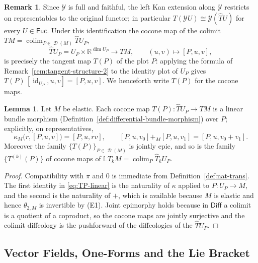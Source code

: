 \documentclass{amsart}
\newcommand{\R}{\mathbb{R}}
\DeclareMathOperator{\D}{\mathcal{D}}
\DeclareMathOperator{\id}{id}
\DeclareMathOperator{\colim}{colim}
\theoremstyle{definition}
\newtheorem{rem}[thm]{Remark}
\newtheorem{lem}[thm]{Lemma}
\begin{document}
\begin{rem}\label{rem:cocone-TP}
Since $\mathcal{Y}$ is full and faithful, the left Kan extension along
$\mathcal{Y}$ restricts on representables to the original functor; in
particular $T(\mathcal{Y}U) \cong \mathcal{Y}(\hat{T}U)$ for every
$U \in \mathsf{Euc}$. Under this identification the cocone map of the colimit
$TM = \colim_{P \in \D(M)} \hat{T}U_P$,
\begin{equation*}
  \hat{T}U_P = U_P \times \R^{\dim U_P} \longrightarrow TM,
  \qquad (u,v) \longmapsto [P,u,v],
\end{equation*}
is precisely the tangent map $T(P)$ of the plot $P$: applying the formula of
Remark~\ref{rem:tangent-structure-2} to the identity plot of $U_P$ gives
$T(P)\,[\id_{U_P},u,v] = [P,u,v]$. We henceforth write $T(P)$ for the cocone
maps.
\end{rem}

\begin{lem}\label{lem:TP-linear}
Let $M$ be elastic. Each cocone map $T(P) \colon \hat{T}U_P \to TM$ is a
linear bundle morphism (Definition~\ref{def:differential-bundle-morphism})
over $P$; explicitly, on representatives,
\begin{equation}\label{eq:TP-linear}
  \kappa_M\bigl(r,[P,u,v]\bigr) = [P,u,rv],
  \qquad
  [P,u,v_0] +_M [P,u,v_1] = [P,u,v_0+v_1].
\end{equation}
Moreover the family $\{T(P)\}_{P \in \D(M)}$ is jointly epic, and so is the
family $\{T^{(k)}(P)\}$ of cocone maps of
$\mathbb{L}\hat{T}_kM = \colim_P \hat{T}_kU_P$.
\end{lem}

\begin{proof}
Compatibility with $\pi$ and $0$ is immediate from
Definition~\ref{def:nat-trans}. The first identity in \eqref{eq:TP-linear} is
the naturality of $\kappa$ applied to $P \colon U_P \to M$, and the second is
the naturality of $+$, which is available because $M$ is elastic and hence
$\theta_{2,M}$ is invertible by (E1). Joint epimorphy holds because in
$\mathsf{Diff}$ a colimit is a quotient of a coproduct, so the cocone maps are
jointly surjective and the colimit diffeology is the pushforward of the
diffeologies of the $\hat{T}U_P$.
\end{proof}


\subsection{Vector Fields, One-Forms and the Lie Bracket}
\end{document}
